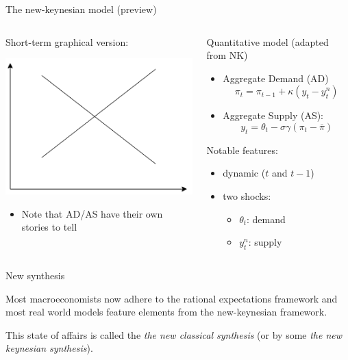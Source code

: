 \begin{frame}{The new-keynesian model (preview)}
\protect\hypertarget{the-new-keynesian-model-preview}{}
\begin{columns}[T]
\begin{column}{0.48\textwidth}
Short-term graphical version:

\includegraphics{assets/as_ad.png}

\begin{itemize}
\tightlist
\item
  Note that AD/AS have their own stories to tell
\end{itemize}
\end{column}

\begin{column}{0.48\textwidth}
Quantitative model (adapted from NK)

\begin{itemize}
\tightlist
\item
  Aggregate Demand (AD) \[\pi_t = \pi_{t-1} + \kappa (y_t - y^n_t)\]
\item
  Aggregate Supply (AS):
  \[y_t = \theta_t - \sigma \gamma (\pi_t - \overline{\pi})\]
\end{itemize}

Notable features:

\begin{itemize}
\tightlist
\item
  dynamic (\(t\) and \(t-1\))
\item
  two shocks:

  \begin{itemize}
  \tightlist
  \item
    \(\theta_t\): demand
  \item
    \(y^n_t\): supply
  \end{itemize}
\end{itemize}
\end{column}
\end{columns}
\end{frame}

\begin{frame}{New synthesis}
\protect\hypertarget{new-synthesis}{}


Most macroeconomists now adhere to the rational expectations framework
and most real world models feature elements from the new-keynesian
framework.

This state of affairs is called the \emph{the new classical synthesis}
(or by some \emph{the new keynesian synthesis}).
\end{frame}

\begin{frame}
\end{frame}
